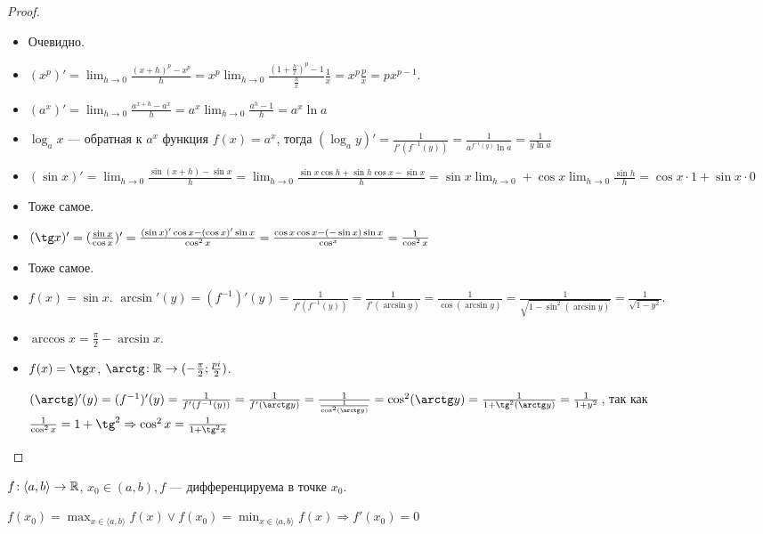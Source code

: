 \begin{proof}
    \begin{itemize}
        \item Очевидно.
        \item $(x^p)' = \lim_{h \to 0} \frac{(x + h)^p - x^p}{h} = x^p \lim_{h \to 0} \frac{(1 + \frac{h}{x})^p - 1}{\frac{h}{x}} \frac{1}{x} = x^p \frac{p}{x} = px^{p - 1}$.
        \item $(a^x)' = \lim_{h \to 0} \frac{a^{x+h} - a^x}{h} = a^x \lim_{h \to 0} \frac{a^h - 1}{h} = a^x \ln a$
        \item $\log_a x$ --- обратная к  $a^x$ функция  $f(x) = a^x$, тогда  $(\log_a y)' = \frac{1}{f'(f^{-1}(y))} = \frac{1}{a^{f^{-1}(y)} \ln a} = \frac{1}{y \ln a}$
        \item $(\sin x)' = \lim_{h \to 0} \frac{\sin(x+h) - \sin x}{h} = \lim_{h \to 0} \frac{\sin x \cos h + \sin h \cos x - \sin x}{h} = \sin x \lim_{h\to 0} + \cos x \lim_{h \to 0} \frac{\sin h}{h} = \cos x \cdot 1 + \sin x \cdot 0$ 
        \item Тоже самое.
        \item $(\tg x)' = (\frac{\sin x}{\cos x})' = \frac{(\sin x)' \cos x - (\cos x)' \sin x}{\cos^2 x} = \frac{\cos x \cos x - (-\sin x) \sin x}{\cos ^ x} = \frac{1}{\cos^2 x}$
        \item Тоже самое.
        \item $f(x) = \sin x$.  $\arcsin' (y) = (f^{-1})'(y) = \frac{1}{f'(f^{-1}(y))} = \frac{1}{f'(\arcsin y)} = \frac{1}{\cos(\arcsin y)} = \frac{1}{\sqrt{1 - \sin^2(\arcsin y)}} = \frac{1}{\sqrt{1 - y^2}}$.
        \item $\arccos x = \frac{\pi}{2} - \arcsin x$.
        \item $f(x) = \tg x$,  $\arctg\!: \R \to (-\frac{\pi}{2}; \frac{pi}{2})$.

            $(\arctg)'(y) = (f^{-1})'(y) = \frac{1}{f'(f^{-1}(y))} = \frac{1}{f'(\arctg y)} = \frac{1}{\frac{1}{\cos^2(\arctg y)}} = \cos^2(\arctg y) = \frac{1}{1+\tg^2(\arctg y)} = \frac{1}{1+y^2}$, так как  $\frac{1}{\cos^2 x} = 1 + \tg^2 \Rightarrow \cos^2 x = \frac{1}{1 + \tg^2 x}$
    \end{itemize}
\end{proof}
\begin{theorem}
    $f\!: \langle a, b \rangle \to \mathbb{R}$,  $x_0 \in (a, b), f$ --- дифференцируема в  точке $x_0$.

    $f(x_0) = \max_{x \in \langle a, b \rangle}f(x) \lor f(x_0) = \min_{x \in \langle a, b \rangle}f(x) \Rightarrow f'(x_0) = 0$
\end{theorem}
